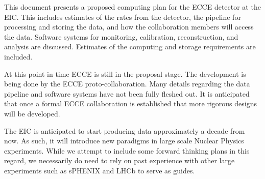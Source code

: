 

This document presents a proposed computing plan for the ECCE detector at the EIC\cite{eic_yellow_report_v1_1}. This includes estimates of the rates from the detector, the pipeline for processing and storing the data, and how the collaboration members will access the data. Software systems for monitoring, calibration, reconstruction, and analysis are discussed. Estimates of the computing and storage requirements are included.

At this point in time ECCE is still in the proposal stage. The development is being done by the ECCE proto-collaboration. Many details regarding the data pipeline and software systems have not been fully fleshed out. It is anticipated that once a formal ECCE collaboration is established that more rigorous designs will be developed. 

The EIC is anticipated to start producing data approximately a decade from now. As such, it will introduce new paradigms in large scale Nuclear Physics experiments. While we attempt to include some forward thinking plans in this regard, we necessarily do need to rely on past experience with other large experiments such as sPHENIX\cite{sphenix_computing_plan_2019} and LHCb\cite{CAMPORAPEREZ2016280} to serve as guides.